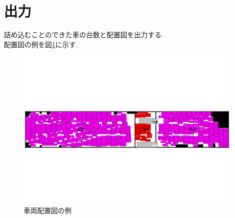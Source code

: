 \section{出力}
詰め込むことのできた車の台数と配置図を出力する. \\
配置図の例を図\ref{figure22}に示す.
\begin{figure}[b]
    \hspace{2cm}
    \includegraphics[scale=0.3, bb = 0 0 1 1]{2car_haichi.pdf}
    \caption{車両配置図の例}
    \label{figure22}
\end{figure}


